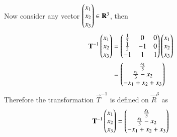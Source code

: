 Now consider any vector $\begin{pmatrix}x_1\\x_2\\x_3\end{pmatrix} \in \mathbf{R}^3$, then
\begin{align}
	\mathbf{T}^{-1}\begin{pmatrix}x_1\\x_2\\x_3\end{pmatrix}&=\begin{pmatrix}\frac{1}{3}&0&0\\
                            \frac{1}{3}&-1&0\\
                            -1&1&1\end{pmatrix}\begin{pmatrix}x_1\\x_2\\x_3\end{pmatrix}\\
			    &=\begin{pmatrix}\frac{x_1}{3}\\\frac{x_1}{3}-x_2\\-x_1+x_2+x_3\end{pmatrix}
\end{align}
Therefore the transformation $\vec{T}^{-1}$ is defined on $\vec{R}^3 $ as
\begin{align}
\mathbf{T}^{-1}\begin{pmatrix}x_1\\x_2\\x_3\end{pmatrix}=\begin{pmatrix}\frac{x_1}{3}\\\frac{x_1}{3}-x_2\\-x_1+x_2+x_3\end{pmatrix}
\end{align}
